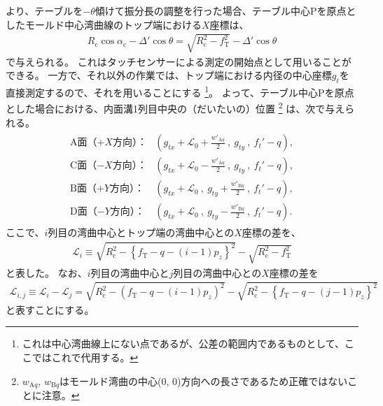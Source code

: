 \clearpage
より、テーブルを$-\theta$傾けて振分長の調整を行った場合、テーブル中心Pを原点としたモールド中心湾曲線のトップ端における$X$座標は、
\begin{align*}
  R_\mathrm c\cos\alpha_\mathrm c-\varDelta'\cos\theta = \sqrt{R_\mathrm c^2-f_\mathrm T^2}-\varDelta'\cos\theta
\end{align*}
で与えられる。
これはタッチセンサーによる測定の開始点として用いることができる。
一方で、それ以外の作業では、トップ端における内径の中心座標$g_t$を直接測定するので、それを用いることにする
\footnote{これは中心湾曲線上にない点であるが、公差の範囲内であるものとして、ここではこれで代用する。}。
よって、テーブル中心Pを原点とした場合における、内面溝1列目中央の（だいたいの）位置
\footnote{$w_{\mathrm Aq}$, $w_{\mathrm Bq}$はモールド湾曲の中心(0, 0)方向への長さであるため正確ではないことに注意。}\relax
は、次で与えられる。
\begin{align*}
\begin{array}{rl}
  \text{A面（$+X$方向）：}
  & \displaystyle
    \left(
      g_{tx}+\mathcal L_0+\frac{w'_{\mathrm Aq}}2~,~
      g_{ty}~,~
      f_t'-q
    \right),\\[12pt]
  \text{C面（$-X$方向）：}
  & \displaystyle
    \left(
      g_{tx}+\mathcal L_0-\frac{w'_{\mathrm Aq}}2~,~
      g_{ty}~,~
      f_t'-q
    \right),\\[12pt]
  \text{B面（$+Y$方向）：}
  & \displaystyle
    \left(
      g_{tx}+\mathcal L_0~,~
      g_{ty}+\frac{w'_{\mathrm Bq}}2~,~
      f_t'-q
    \right),\\[12pt]
  \text{D面（$-Y$方向）：}
  & \displaystyle
    \left(
      g_{tx}+\mathcal L_0~,~
      g_{ty}-\frac{w'_{\mathrm Bq}}2~,~
      f_t'-q
    \right).
\end{array}
\end{align*}
ここで、$i$列目の湾曲中心とトップ端の湾曲中心との$X$座標の差を、
\begin{align}
  \label{eq:dimpleCenterDistance}
  \mathcal L_i
  \equiv \sqrt{R_\mathrm c^2-\left\{f_\mathrm T-q-(i-1)p_z\right\}^2}-\sqrt{R_\mathrm c^2-f_\mathrm T^2}
\end{align}
と表した。
なお、$i$列目の湾曲中心と$j$列目の湾曲中心との$X$座標の差を
\begin{align*}
  \mathcal L_{i,j}
  \equiv \mathcal L_i-\mathcal L_j
  = \sqrt{R_\mathrm c^2-\left(f_\mathrm T-q-(i-1)p_z\right)^2}
    -\sqrt{R_\mathrm c^2-\left\{f_\mathrm T-q-(j-1)p_z\right\}^2}
\end{align*}
と表すことにする。




